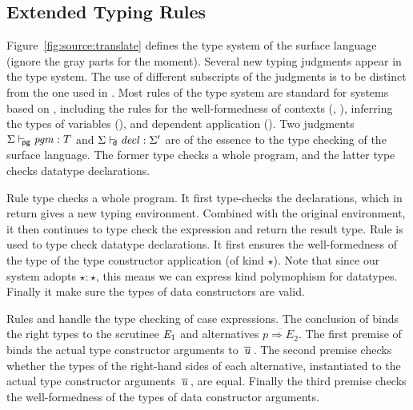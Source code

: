 \subsection{Extended Typing Rules}
 

Figure~\ref{fig:source:translate} defines the type system of the
surface language (ignore the gray parts for the moment). Several new
typing judgments appear in the type system. The use of different
subscripts of the judgments is to be distinct from the one used in
\name. Most rules of the type system are standard for systems based on
\coc, including the rules for the well-formedness of contexts
(, ), inferring the types of
variables (), and dependent application
(). Two judgments $ \Sigma  \vdash_{\!\!\mathsf{pg} }  \mathit{pgm}  :  T $ and
$ \Sigma  \vdash_{\!\!\mathsf{d} }  \mathit{decl}  :  \Sigma' $ are of the essence to the type checking of the
surface language. The former type checks a whole program, and the
latter type checks datatype declarations.

Rule  type checks a whole program. It first
type-checks the declarations, which in return gives a new typing
environment. Combined with the original environment, it then continues
to type check the expression and return the result type. Rule
 is used to type check datatype declarations. It
first ensures the well-formedness of the type of the type constructor
application (of kind $\star$). Note that since our system adopts
$\star : \star$, this means we can express kind polymophism for
datatypes. Finally it make sure the types of data constructors are
valid.

Rules  and  handle the type
checking of case expressions. The conclusion of 
binds the right types to the scrutinee $\mathit{E_{{\mathrm{1}}}}$ and alternatives
$\overline{p \Rightarrow E_2}$. The first premise of
 binds the actual type constructor arguments to
$\,\overline{  \mathit{u}  }\,$. The second premise checks whether the types of the
right-hand sides of each alternative, instantiated to the actual type
constructor arguments $\,\overline{  \mathit{u}  }\,$, are equal. Finally the third
premise checks the well-formedness of the types of data constructor
arguments.   

